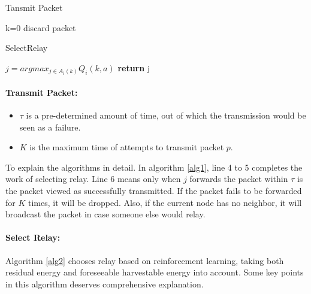 \documentclass[10pt,twocolumn,letterpaper]{article}
\begin{document}
\begin{algorithm}[htbp]
	\BlankLine
	\caption{Tansmit Packet}\label{TP}
	\BlankLine
	{
		k=0\;
		discard packet\;
	}
	\label{alg1}
\end{algorithm}
\begin{algorithm}[htbp]
	\BlankLine
	\caption{SelectRelay}\label{SR}
	\BlankLine
	$j=arg max_{j\in A_i(k)}Q_i(k,a)$\;
	\textbf{return} j\;
	\label{alg2}
\end{algorithm}

\paragraph{Transmit Packet:}
\begin{itemize}
	\item $\tau$ is a pre-determined amount of time, out of which the transmission would be seen as a failure.
	\item $K$ is the maximum time of attempts to transmit packet $p$.  
\end{itemize}

To explain the algorithms in detail. In algorithm \ref{alg1}, line 4 to 5 completes the work of selecting relay. Line 6 means only when $j$ forwards the packet within $\tau$ is the packet viewed as successfully transmitted. If the packet fails to be forwarded for $K$ times, it will be dropped. Also, if the current node has no neighbor, it will broadcast the packet in case someone else would relay.

\paragraph{Select Relay:}
Algorithm \ref{alg2} chooses relay based on reinforcement learning, taking both residual energy and foreseeable harvestable energy into account. Some key points in this algorithm deserves comprehensive explanation.
\end{document}
